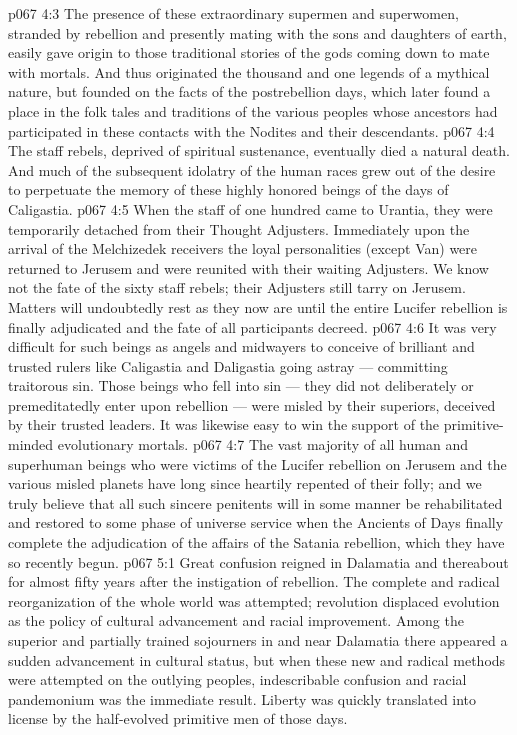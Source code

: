 \vs p067 4:3 The presence of these extraordinary supermen and superwomen, stranded by rebellion and presently mating with the sons and daughters of earth, easily gave origin to those traditional stories of the gods coming down to mate with mortals. And thus originated the thousand and one legends of a mythical nature, but founded on the facts of the postrebellion days, which later found a place in the folk tales and traditions of the various peoples whose ancestors had participated in these contacts with the Nodites and their descendants.
\vs p067 4:4 The staff rebels, deprived of spiritual sustenance, eventually died a natural death. And much of the subsequent idolatry of the human races grew out of the desire to perpetuate the memory of these highly honored beings of the days of Caligastia.
\vs p067 4:5 When the staff of one hundred came to Urantia, they were temporarily detached from their Thought Adjusters. Immediately upon the arrival of the Melchizedek receivers the loyal personalities (except Van) were returned to Jerusem and were reunited with their waiting Adjusters. We know not the fate of the sixty staff rebels; their Adjusters still tarry on Jerusem. Matters will undoubtedly rest as they now are until the entire Lucifer rebellion is finally adjudicated and the fate of all participants decreed.
\vs p067 4:6 \pc It was very difficult for such beings as angels and midwayers to conceive of brilliant and trusted rulers like Caligastia and Daligastia going astray --- committing traitorous sin. Those beings who fell into sin --- they did not deliberately or premeditatedly enter upon rebellion --- were misled by their superiors, deceived by their trusted leaders. It was likewise easy to win the support of the primitive\hyp{}minded evolutionary mortals.
\vs p067 4:7 The vast majority of all human and superhuman beings who were victims of the Lucifer rebellion on Jerusem and the various misled planets have long since heartily repented of their folly; and we truly believe that all such sincere penitents will in some manner be rehabilitated and restored to some phase of universe service when the Ancients of Days finally complete the adjudication of the affairs of the Satania rebellion, which they have so recently begun.
\vs p067 5:1 Great confusion reigned in Dalamatia and thereabout for almost fifty years after the instigation of rebellion. The complete and radical reorganization of the whole world was attempted; revolution displaced evolution as the policy of cultural advancement and racial improvement. Among the superior and partially trained sojourners in and near Dalamatia there appeared a sudden advancement in cultural status, but when these new and radical methods were attempted on the outlying peoples, indescribable confusion and racial pandemonium was the immediate result. Liberty was quickly translated into license by the half\hyp{}evolved primitive men of those days.
